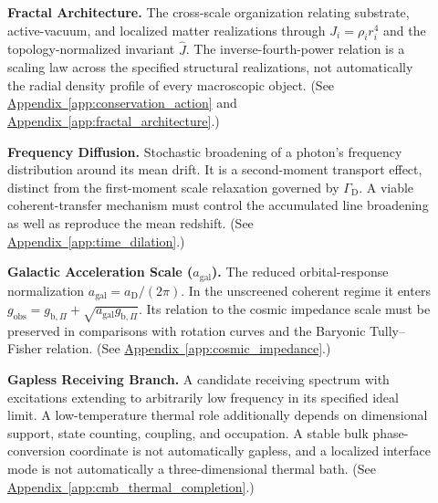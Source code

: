 \begin{description}
\item[] \begin{minipage}[t]{\linewidth}
\textbf{Fractal Architecture.} The cross-scale organization relating substrate, active-vacuum, and localized matter realizations through $J_i=\rho_i r_i^4$ and the topology-normalized invariant $\hat J$. The inverse-fourth-power relation is a scaling law across the specified structural realizations, not automatically the radial density profile of every macroscopic object.
(See \hyperref[app:conservation_action]{Appendix~\ref*{app:conservation_action}} and \hyperref[app:fractal_architecture]{Appendix~\ref*{app:fractal_architecture}}.)
\end{minipage}

\item[] \begin{minipage}[t]{\linewidth}
\textbf{Frequency Diffusion.} Stochastic broadening of a photon's frequency distribution around its mean drift. It is a second-moment transport effect, distinct from the first-moment scale relaxation governed by $\Gamma_{\mathrm D}$. A viable coherent-transfer mechanism must control the accumulated line broadening as well as reproduce the mean redshift.
(See \hyperref[app:time_dilation]{Appendix~\ref*{app:time_dilation}}.)
\end{minipage}

\item[] \begin{minipage}[t]{\linewidth}
\textbf{Galactic Acceleration Scale ($a_{\mathrm{gal}}$).} The reduced orbital-response normalization $a_{\mathrm{gal}}=a_{\mathrm D}/(2\pi)$. In the unscreened coherent regime it enters $g_{\mathrm{obs}}=g_{\mathrm b,\Pi}+\sqrt{a_{\mathrm{gal}}g_{\mathrm b,\Pi}}$. Its relation to the cosmic impedance scale must be preserved in comparisons with rotation curves and the Baryonic Tully--Fisher relation.
(See \hyperref[app:cosmic_impedance]{Appendix~\ref*{app:cosmic_impedance}}.)
\end{minipage}

\item[] \begin{minipage}[t]{\linewidth}
\textbf{Gapless Receiving Branch.} A candidate receiving spectrum with excitations extending to arbitrarily low frequency in its specified ideal limit. A low-temperature thermal role additionally depends on dimensional support, state counting, coupling, and occupation. A stable bulk phase-conversion coordinate is not automatically gapless, and a localized interface mode is not automatically a three-dimensional thermal bath.
(See \hyperref[app:cmb_thermal_completion]{Appendix~\ref*{app:cmb_thermal_completion}}.)
\end{minipage}


\end{description}
